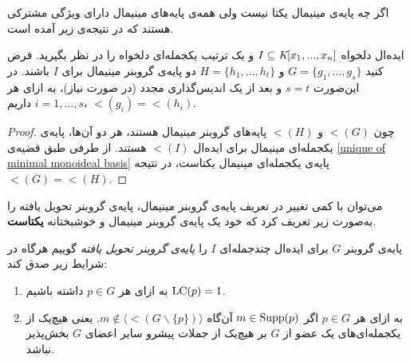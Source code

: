 اگر چه پایه‌ی مینیمال یکتا نیست ولی همه‌ی پایه‌های مینیمال دارای ویژگی‌ مشترکی هستند که در نتیجه‌ی زیر آمده است.
\begin{corollary}
	\label{minimal groebner basis th}
	ایده‌ال دلخواه 
	$I\subseteq \textit{K}[x_{1},...,x_{n}]$
	و یک ترتیب‌ یکجمله‌ای دلخواه را در نظر بگیرید. فرض کنید 
	$G = \{g_{1},...,g_{s}\}$
	و
	$H = \{h_{1},...,h_{t}\}$
	دو پایه‌ی گروبنر مینیمال برای 
	$I$
	باشند. در این‌صورت 
	$s = t$
	و بعد از یک اندیس‌گذاری مجدد (در صورت نیاز)، به ازای هر 
	$i = 1,...,s$
	داریم، 
	$\lt(g_{i}) = \lt(h_{i})$.
\end{corollary}
\begin{proof}
	چون 
	$\lt(G)$
	و
	$\lt(H)$
	پایه‌های گروبنر مینیمال هستند، هر دو آن‌ها، پایه‌ی یکجمله‌ای مینیمال برای ایده‌ال 
	$\lt(I)$
	هستند. از طرفی طبق قضیه‌ی 
	\ref{unique of minimal monoideal basis}
	پایه‌ی یکجمله‌ای مینیمال یکتاست، در نتیجه 
	{\small $\lt(G) = \lt(H)$}.
\end{proof}

می‌توان با کمی تغییر در تعریف پایه‌ی گروبنر مینیمال، پایه‌ی گروبنر تحویل یافته را به‌صورت زیر تعریف کرد که خود یک پایه‌ی گروبنر مینیمال و خوشبختانه \textbf{یکتاست}.

\begin{definition}
پایه‌ی گروبنر 
$G$
برای ایده‌ال چندجمله‌ای 
$I$
را 
\textit{پایه‌ی گروبنر تحویل یافته}
گوییم هرگاه در شرایط زیر صدق کند:
\begin{enumerate}
\item
به ازای هر 
$p\in G$
داشته باشیم
$\operatorname{\mathrm{LC}}(p) = 1$.
\item
به ازای هر 
$p\in G$
اگر 
$m\in \operatorname{\mathrm{Supp}}(p)$
آن‌گاه 
$m\notin\langle \lt(G\backslash\{p\})\rangle$.
یعنی هیچ‌یک از یکجمله‌ای‌های یک عضو از 
$G$
بر هیچ‌یک از جملات پیشرو سایر اعضای 
$G$
بخش‌پذیر نباشد.
\end{enumerate}
\end{definition}

